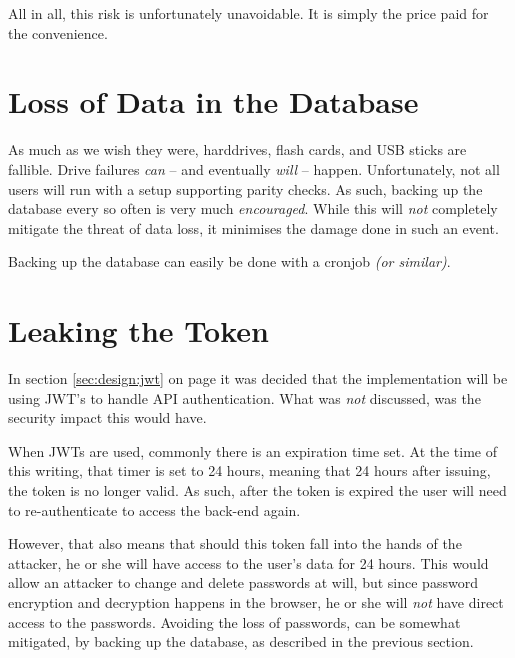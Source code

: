 
		All in all, this risk is unfortunately unavoidable. It is simply the price paid for the convenience.
	
	\section{Loss of Data in the Database}
		As much as we wish they were, harddrives, flash cards, and USB sticks are fallible. Drive failures \emph{can} -- and eventually \emph{will} -- happen. Unfortunately, not all users will run with a setup supporting parity checks. As such, backing up the database every so often is very much \emph{encouraged}. While this will \emph{not} completely mitigate the threat of data loss, it minimises the damage done in such an event.

		Backing up the database can easily be done with a cronjob \emph{(or similar)}.

	\section{Leaking the Token}
		In section \ref{sec:design:jwt} on page \pageref{sec:design:jwt} it was decided that the implementation will be using JWT's to handle API authentication. What was \emph{not} discussed, was the security impact this would have.

		When JWTs are used, commonly there is an expiration time set. At the time of this writing, that timer is set to 24 hours, meaning that 24 hours after issuing, the token is no longer valid. As such, after the token is expired the user will need to re-authenticate to access the back-end again.

		However, that also means that should this token fall into the hands of the attacker, he or she will have access to the user's data for 24 hours. This would allow an attacker to change and delete passwords at will, but since password encryption and decryption happens in the browser, he or she will \emph{not} have direct access to the passwords. Avoiding the loss of passwords, can be somewhat mitigated, by backing up the database, as described in the previous section.

